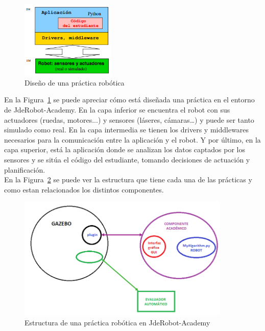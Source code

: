 \begin{figure}[H]
  \begin{center}
    \includegraphics[width=0.4\textwidth]{figures/Introduccion/esquema.png}
		\caption{Diseño de una práctica robótica}
		\label{fig.esquema}
		\end{center}
\end{figure}

En la Figura~\ref{fig.esquema} se puede apreciar cómo está diseñada una práctica en el entorno de JdeRobot-Academy. En la capa inferior se encuentra el robot con sus actuadores (ruedas, motores...) y sensores (láseres, cámaras…) y puede ser tanto simulado como real.  En la capa intermedia se tienen los drivers y middlewares necesarios para la comunicación entre la aplicación y el robot. Y por último, en la capa superior, está la aplicación donde se analizan los datos captados por los sensores y se sitúa el código del estudiante, tomando decisiones de actuación y planificación. \\

En la Figura~\ref{fig.estructura} se puede ver la estructura que tiene cada una de las prácticas y como estan relacionados los distintos componentes.

\begin{figure}[H]
  \begin{center}
    \includegraphics[width=0.9\textwidth]{figures/Introduccion/estructura.png}
		\caption{Estructura de una práctica robótica en JdeRobot-Academy}
		\label{fig.estructura}
		\end{center}
\end{figure}


